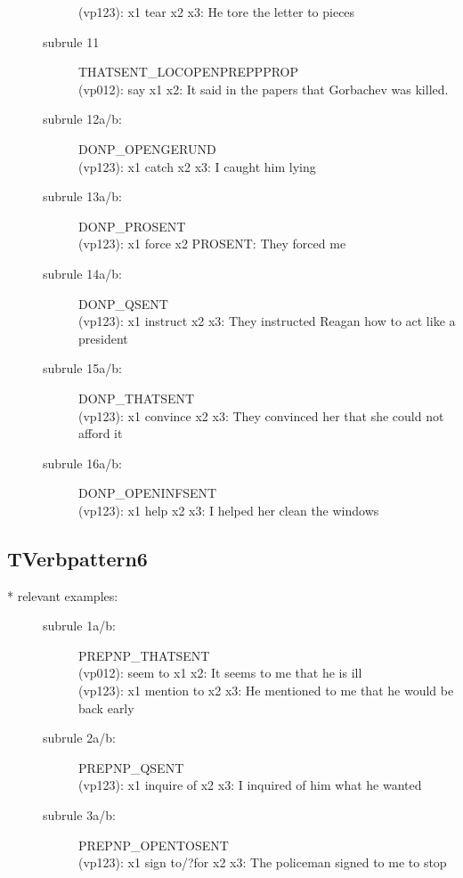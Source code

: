 \begin{description}
\begin{description}
  (vp123): x1 tear x2 x3: He tore the letter to pieces
\item[subrule 11] THATSENT\_LOCOPENPREPPPROP\\
  (vp012): say x1 x2: It said in the papers that Gorbachev was killed.
\item[subrule 12a/b:]DONP\_OPENGERUND\\
  (vp123): x1 catch x2 x3: I caught him lying\\
\item[subrule 13a/b:]DONP\_PROSENT\\
  (vp123): x1 force x2 PROSENT: They forced me
\item[subrule 14a/b:]DONP\_QSENT\\
  (vp123): x1 instruct x2 x3: They instructed Reagan how to act like a 
president
\item[subrule 15a/b:]DONP\_THATSENT\\
  (vp123): x1 convince x2 x3: They convinced her that she could not afford it\\
\item[subrule 16a/b:]DONP\_OPENINFSENT\\
  (vp123): x1 help x2 x3: I helped her clean the windows\\
\end{description}
\end{description}

\subsection{TVerbpattern6}
\begin{description}
\item[* relevant examples:] \mbox{}
\begin{description}
\item[subrule 1a/b:] PREPNP\_THATSENT\\
  (vp012): seem to x1 x2: It seems to me that he is ill\\
  (vp123): x1 mention to x2 x3: He mentioned to me that he would be back early
\item[subrule 2a/b:] PREPNP\_QSENT\\
  (vp123): x1 inquire of x2 x3: I inquired of him what he wanted
\item[subrule 3a/b:] PREPNP\_OPENTOSENT\\
  (vp123): x1 sign to/?for x2 x3: The policeman signed to me to stop\\
\end{description}
\end{description}


